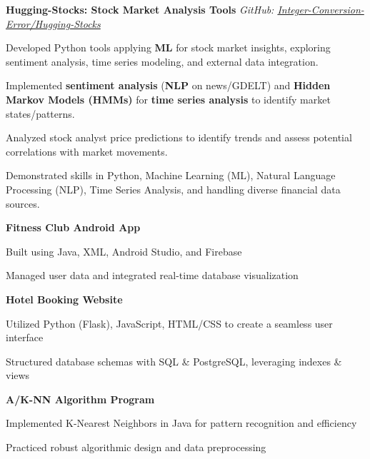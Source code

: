 \documentclass[11pt]{article}
\begin{document}
\begin{small}
\noindent\textbf{Hugging-Stocks: Stock Market Analysis Tools} \hfill \textit{GitHub: \href{https://github.com/Integer-Conversion-Error/Hugging-Stocks}{Integer-Conversion-Error/Hugging-Stocks}}
\begin{compactitem}
    \item Developed Python tools applying \textbf{ML} for stock market insights, exploring sentiment analysis, time series modeling, and external data integration.
    \item Implemented \textbf{sentiment analysis} (\textbf{NLP} on news/GDELT) and \textbf{Hidden Markov Models (HMMs)} for \textbf{time series analysis} to identify market states/patterns.
    \item Analyzed stock analyst price predictions to identify trends and assess potential correlations with market movements.
    \item Demonstrated skills in Python, Machine Learning (ML), Natural Language Processing (NLP), Time Series Analysis, and handling diverse financial data sources.
\end{compactitem}

\noindent\textbf{Fitness Club Android App}
\begin{compactitem}
    \item Built using Java, XML, Android Studio, and Firebase
    \item Managed user data and integrated real-time database visualization
\end{compactitem}

\noindent\textbf{Hotel Booking Website}
\begin{compactitem}
    \item Utilized Python (Flask), JavaScript, HTML/CSS to create a seamless user interface
    \item Structured database schemas with SQL \& PostgreSQL, leveraging indexes \& views
\end{compactitem}

\noindent\textbf{A/K-NN Algorithm Program}
\begin{compactitem}
    \item Implemented K-Nearest Neighbors in Java for pattern recognition and efficiency
    \item Practiced robust algorithmic design and data preprocessing
\end{compactitem}

\end{small}


\end{document}
